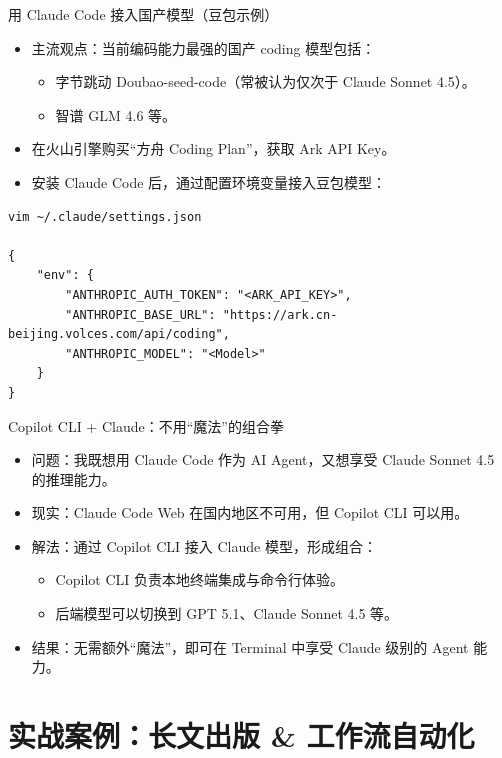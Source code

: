 \documentclass[aspectratio=169]{beamer}
\begin{document}
\begin{frame}[fragile]{用 Claude Code 接入国产模型（豆包示例）}
  \begin{itemize}
    \item 主流观点：当前编码能力最强的国产 coding 模型包括：
      \begin{itemize}
        \item 字节跳动 Doubao-seed-code（常被认为仅次于 Claude Sonnet 4.5）。
        \item 智谱 GLM 4.6 等。
      \end{itemize}
    \item 在火山引擎购买“方舟 Coding Plan”，获取 Ark API Key。
    \item 安装 Claude Code 后，通过配置环境变量接入豆包模型：
  \end{itemize}

  \vspace{0.5em}
\begin{verbatim}
vim ~/.claude/settings.json

{
    "env": {
        "ANTHROPIC_AUTH_TOKEN": "<ARK_API_KEY>",
        "ANTHROPIC_BASE_URL": "https://ark.cn-beijing.volces.com/api/coding",
        "ANTHROPIC_MODEL": "<Model>"
    }
}
\end{verbatim}
\end{frame}

\begin{frame}{Copilot CLI + Claude：不用“魔法”的组合拳}
  \begin{itemize}
    \item 问题：我既想用 Claude Code 作为 AI Agent，又想享受 Claude Sonnet 4.5 的推理能力。
    \item 现实：Claude Code Web 在国内地区不可用，但 Copilot CLI 可以用。
    \item 解法：通过 Copilot CLI 接入 Claude 模型，形成组合：
      \begin{itemize}
        \item Copilot CLI 负责本地终端集成与命令行体验。
        \item 后端模型可以切换到 GPT 5.1、Claude Sonnet 4.5 等。
      \end{itemize}
    \item 结果：无需额外“魔法”，即可在 Terminal 中享受 Claude 级别的 Agent 能力。
  \end{itemize}
\end{frame}

\section{实战案例：长文出版 \& 工作流自动化}
\end{document}
